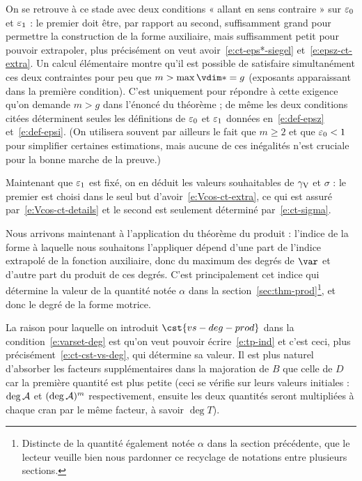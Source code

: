 On se retrouve à ce stade avec deux conditions « allant en sens contraire »
sur \( \varepsilon\sb0 \) et \( \varepsilon\sb1 \) : le premier doit être, par rapport au second,
suffisamment grand pour permettre la construction de la forme auxiliaire, mais
suffisamment petit pour pouvoir extrapoler, plus précisément on veut
avoir~\eqref{e:ct-eps*-siegel} et~\eqref{e:epsz-ct-extra}. Un calcul
élémentaire montre qu'il est possible de satisfaire simultanément ces deux
contraintes pour peu que \( m > \max \vdim* = g \) (exposants
apparaissant dans la première condition).  C'est uniquement pour répondre à
cette exigence qu'on demande \( m > g \) dans l'énoncé du théorème ;
de même les deux conditions citées déterminent seules les définitions de \(
  \varepsilon\sb0 \) et \( \varepsilon\sb1 \) données en~\eqref{e:def-epsz} et~\eqref{e:def-epsi}.
(On utilisera souvent par ailleurs le fait que \( m \ge 2 \) et que \(
  \varepsilon\sb0 < 1 \) pour simplifier certaines estimations, mais aucune de ces
inégalités n'est cruciale pour la bonne marche de la preuve.)

Maintenant que \( \varepsilon\sb1 \) est fixé, on en déduit les valeurs souhaitables de
\( \gamma \sb{\mathrm{V}} \) et \( \sigma \) : le premier est choisi dans le seul but
d'avoir~\eqref{e:Vcos-ct-extra}, ce qui est assuré
par~\eqref{e:Vcos-ct-details} et le second est seulement déterminé
par~\eqref{e:ct-sigma}.

Nous arrivons maintenant à l'application du théorème du produit : l'indice de
la forme à laquelle nous souhaitons l'appliquer dépend d'une part de l'indice
extrapolé de la fonction auxiliaire, donc du maximum des degrés de \( \var \)
et d'autre part du produit de ces degrés. C'est principalement cet indice qui
détermine la valeur de la quantité notée \( \alpha \) dans la
section~\vref{sec:thm-prod}\footnote{Distincte de la quantité également notée
  \( \alpha \) dans la section précédente, que le lecteur veuille bien nous
  pardonner ce recyclage de notations entre plusieurs sections.}, et donc le
degré de la forme motrice.

La raison pour laquelle on introduit \( \cst{vs-deg-prod} \) dans la
condition~\eqref{e:varset-deg} est qu'on veut pouvoir écrire~\eqref{e:tp-ind}
et c'est ceci, plus précisément~\eqref{e:ct-cst-vs-deg}, qui détermine
sa valeur. Il est plus naturel d'absorber
les facteurs supplémentaires dans la majoration de \( B \) que celle de \( D
\) car la première quantité est  plus petite (ceci se vérifie
sur leurs valeurs initiales : \( \deg \mathcal A \) et \( (\deg \mathcal A)^m \)
respectivement, ensuite les deux quantités seront multipliées à chaque cran
par le même facteur, à savoir \( \deg T \)).


